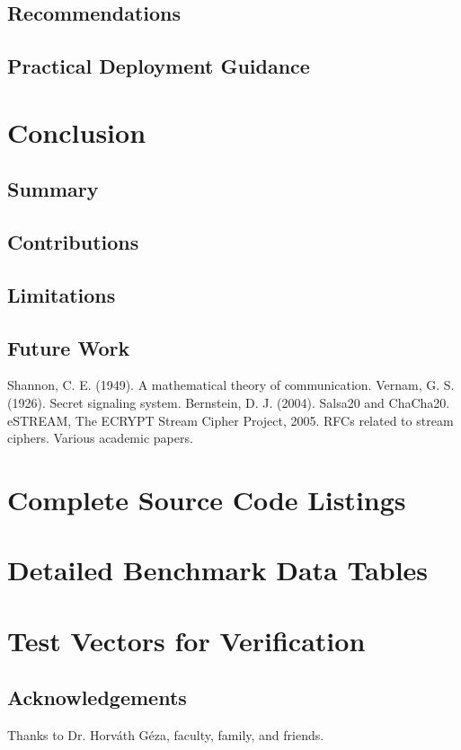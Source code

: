 \documentclass[12pt,a4paper,oneside]{report}
\begin{document}
\section{Recommendations}
\section{Practical Deployment Guidance}

\chapter{Conclusion}
\section{Summary}
\section{Contributions}
\section{Limitations}
\section{Future Work}

\newpage
\begin{thebibliography}{99}
 Shannon, C. E. (1949). A mathematical theory of communication. 
 Vernam, G. S. (1926). Secret signaling system. 
 Bernstein, D. J. (2004). Salsa20 and ChaCha20. 
 eSTREAM, The ECRYPT Stream Cipher Project, 2005.
 RFCs related to stream ciphers.
 Various academic papers.
\end{thebibliography}

\appendix
\chapter{Complete Source Code Listings}
\chapter{Detailed Benchmark Data Tables}
\chapter{Test Vectors for Verification}

\newpage
\section*{Acknowledgements}
Thanks to Dr. Horváth Géza, faculty, family, and friends.
\end{document}
